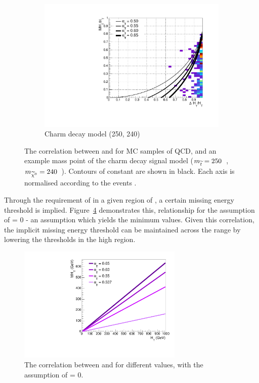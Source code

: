 \begin{figure}[t!]
\begin{subfigure}[t]{.46\textwidth}
    \caption{\zinv}
    \label{fig:alphat_corr_zinv}
  \end{subfigure}\\
  \begin{subfigure}[t]{.46\textwidth}
    \includegraphics[width=\textwidth]{Figs/alphat/alphat_correlation_T2cc_250_240.pdf}
    \caption{Charm decay model (250, 240)}
    \label{fig:alphat_corr_t2cc}
  \end{subfigure}
  \caption{The correlation between \mht and \deltaHT for MC samples of QCD,
  \zinv and an example mass point of the charm decay signal model ($m_{\widetilde{t}} =
  250$~\gev, $m_{\widetilde{\chi}^{0}} = 240$~\gev). Contours of constant \alphat are shown in
  black. Each axis is normalised according to the events \HT.}
  \label{fig:alphat_corr}
\end{figure}

Through the requirement of \alphat in a given region of \HT, a certain missing
energy threshold is implied. Figure~\ref{fig:alphat_mht_corr} demonstrates this,
relationship for
the assumption of \deltaHT = 0 - an assumption which yields the minimum \mht
values. Given this correlation, the implicit missing energy threshold can be
maintained across the \HT range by lowering the \alphat thresholds in the high
\HT
region.

\begin{figure}
  \centering
  \includegraphics[width=0.7\textwidth]{Figs/alphat/mht_correlation.pdf}
  \caption{The correlation between \HT and \mht for different \alphat values,
  with the assumption of \deltaHT = 0.}
  \label{fig:alphat_mht_corr}
\end{figure}

